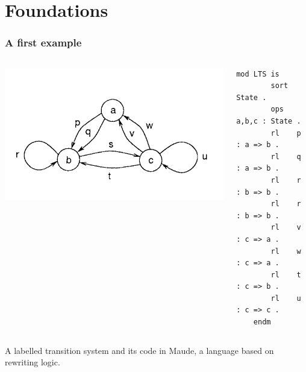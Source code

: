 \documentclass{beamer}
\begin{document}
\section{Foundations}
\begin{frame}[fragile]
    \frametitle{A first example}

    \begin{columns}
        \begin{column}{.5\textwidth}
            \includegraphics[width=\textwidth,height=\textheight,keepaspectratio]{img/lts.png}
        \end{column}

        \begin{column}{.5\textwidth}
            \begin{lstlisting}[language=maude]
    mod LTS is 
        sort State .
        ops a,b,c : State .
        rl    p : a => b .
        rl    q : a => b .
        rl    r : b => b .
        rl    r : b => b .
        rl    v : c => a .
        rl    w : c => a .
        rl    t : c => b .
        rl    u : c => c .
    endm
            \end{lstlisting}
        \end{column}
    \end{columns}

A labelled transition system and its code in Maude, a language based on rewriting logic.
\end{frame}
\end{document}

